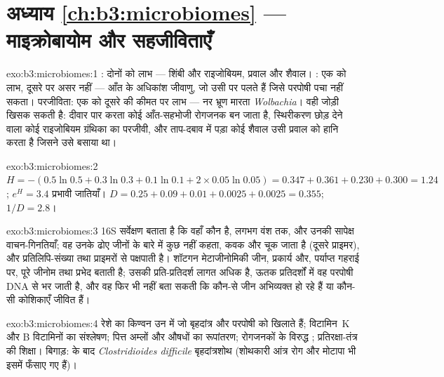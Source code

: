 \section*{अध्याय \ref{ch:b3:microbiomes} --- माइक्रोबायोम और सहजीविताएँ}

\begin{solution}{exo:b3:microbiomes:1}
: दोनों को लाभ --- शिंबी और राइजोबियम, प्रवाल और शैवाल।
: एक को लाभ, दूसरे पर असर नहीं --- आँत के अधिकांश जीवाणु, जो
उसी पर पलते हैं जिसे परपोषी पचा नहीं सकता। परजीविता: एक को दूसरे की
कीमत पर लाभ --- नर भ्रूण मारता \emph{Wolbachia}। वही जोड़ी खिसक सकती
है: दीवार पार करता कोई आँत-सहभोजी रोगजनक बन जाता है, स्थिरीकरण छोड़
देने वाला कोई राइजोबियम ग्रंथिका का परजीवी, और ताप-दबाव में पड़ा कोई
शैवाल उसी प्रवाल को हानि करता है जिसने उसे बसाया था।
\end{solution}

\begin{solution}{exo:b3:microbiomes:2}
$H = -(0.5\ln 0.5 + 0.3\ln 0.3 + 0.1\ln 0.1 + 2\times 0.05\ln 0.05) =
0.347 + 0.361 + 0.230 + 0.300 = 1.24$; $e^{H} = 3.4$ प्रभावी
जातियाँ। $D = 0.25 + 0.09 + 0.01 + 0.0025 + 0.0025 = 0.355$; $1/D =
2.8$।
\end{solution}

\begin{solution}{exo:b3:microbiomes:3}
16S सर्वेक्षण बताता है कि वहाँ कौन है, लगभग वंश तक, और उनकी सापेक्ष
वाचन-गिनतियाँ; वह उनके ढोए जीनों के बारे में कुछ नहीं कहता, कवक और
 चूक जाता है (दूसरे प्राइमर), और प्रतिलिपि-संख्या तथा प्राइमरों
से पक्षपाती है। शॉटगन मेटाजीनोमिकी जीन, प्रकार्य और, पर्याप्त गहराई पर,
पूरे जीनोम तथा प्रभेद बताती है; उसकी प्रति-प्रतिदर्श लागत अधिक है, ऊतक
प्रतिदर्शों में वह परपोषी DNA से भर जाती है, और वह फिर भी नहीं बता
सकती कि कौन-से जीन अभिव्यक्त हो रहे हैं या कौन-सी कोशिकाएँ जीवित हैं।
\end{solution}

\begin{solution}{exo:b3:microbiomes:4}
रेशे का किण्वन उन  में जो बृहदांत्र और परपोषी को
खिलाते हैं; विटामिन~K और B विटामिनों का संश्लेषण; पित्त अम्लों और
औषधों का रूपांतरण; रोगजनकों के विरुद्ध ;
प्रतिरक्षा-तंत्र की शिक्षा। बिगाड़:  के बाद
\emph{Clostridioides difficile} बृहदांत्रशोथ (शोथकारी आंत्र रोग और
मोटापा भी इसमें फँसाए गए हैं)।
\end{solution}

